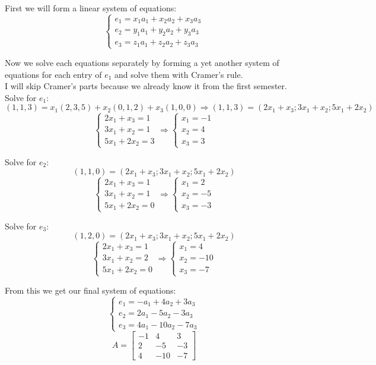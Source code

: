 \documentclass[11pt]{article}
\begin{document}
First we will form a linear system of equations:
\[
\left\{
\begin{aligned}
e_1 = x_1 a_1 + x_2 a_2 + x_3 a_3 \\
e_2 = y_1 a_1 + y_2 a_2 + y_3 a_3 \\
e_3 = z_1 a_1 + z_2 a_2 + z_3 a_3
\end{aligned}
\]

Now we solve each equations separately by forming a yet another system of equations for each entry of $e_1$ and solve them with Cramer's rule.\\
I will skip Cramer's parts because we already know it from the first semester. \\

Solve for $e_1$:
\[
(1,1,3)=x_1(2,3,5)+x_2(0,1,2)+x_3(1,0,0)
\Rightarrow
(1,1,3)=(2x_1+x_3;3x_1+x_2;5x_1+2x_2)
\]
\[
\left\{
\begin{aligned}
2x_1 + x_3 = 1 \\
3x_1 + x_2 = 1 \\
5x_1 + 2x_2 = 3
\end{aligned}
\Rightarrow
\left\{
\begin{aligned}
x_1 = -1 \\
x_2 = 4 \\
x_3 = 3
\end{aligned}
\]

Solve for $e_2$:
\[
(1,1,0)=(2x_1+x_3;3x_1+x_2;5x_1+2x_2)
\]
\[
\left\{
\begin{aligned}
2x_1+x_3=1 \\
3x_1+x_2=1 \\
5x_1+2x_2=0
\end{aligned}
\Rightarrow
\left\{
\begin{aligned}
x_1 = 2 \\
x_2 = -5 \\
x_3 = -3
\end{aligned}
\]

Solve for $e_3$:
\[
(1,2,0)=(2x_1+x_3;3x_1+x_2;5x_1+2x_2)
\]
\[
\left\{
\begin{aligned}
2x_1+x_3=1 \\
3x_1+x_2=2 \\
5x_1+2x_2=0
\end{aligned}
\Rightarrow
\left\{
\begin{aligned}
x_1 = 4 \\
x_2 = -10 \\
x_3 = -7
\end{aligned}
\]

From this we get our final system of equations:
\[
\left\{
\begin{aligned}
e_1 = -a_1 + 4a_2 + 3a_3 \\
e_2 = 2a_1 - 5a_2 - 3a_3 \\
e_3 = 4a_1 - 10a_2 - 7a_3 
\end{aligned}
\]
\[
A =
\begin{bmatrix}
-1 & 4 & 3 \\
2 & -5 & -3 \\
4 & -10 & -7
\end{bmatrix}
\]
\end{document}
